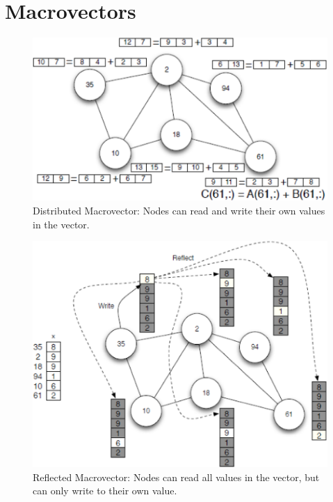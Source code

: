 \chapter{Macrovectors}
\label{appendix:macrovectors}

\begin{figure}
  \centering
  \includegraphics[width=0.8\columnwidth]{fig/DistributedArray.eps}
  \caption[Distributed Macrovector]{Distributed Macrovector: Nodes can read and write their own values in
  the vector.}
  \label{fig:distributedVector}
\end{figure}

\begin{figure}
  \centering
  \includegraphics[width=0.8\columnwidth]{fig/ReflectedArray.eps}
  \caption[Reflected Macrovector]{Reflected Macrovector: Nodes can read all values in the vector, but can only write to their own value.}
  \label{fig:reflectedVector}
\end{figure}

